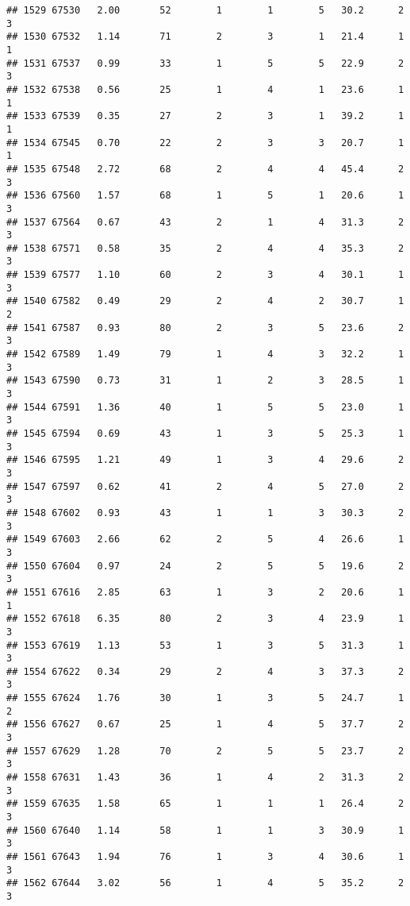 \documentclass[
]{article}
\begin{document}
\begin{verbatim}
## 1529 67530   2.00       52        1        1        5   30.2      2      3
## 1530 67532   1.14       71        2        3        1   21.4      1      1
## 1531 67537   0.99       33        1        5        5   22.9      2      3
## 1532 67538   0.56       25        1        4        1   23.6      1      1
## 1533 67539   0.35       27        2        3        1   39.2      1      1
## 1534 67545   0.70       22        2        3        3   20.7      1      1
## 1535 67548   2.72       68        2        4        4   45.4      2      3
## 1536 67560   1.57       68        1        5        1   20.6      1      3
## 1537 67564   0.67       43        2        1        4   31.3      2      3
## 1538 67571   0.58       35        2        4        4   35.3      2      3
## 1539 67577   1.10       60        2        3        4   30.1      1      3
## 1540 67582   0.49       29        2        4        2   30.7      1      2
## 1541 67587   0.93       80        2        3        5   23.6      2      3
## 1542 67589   1.49       79        1        4        3   32.2      1      3
## 1543 67590   0.73       31        1        2        3   28.5      1      3
## 1544 67591   1.36       40        1        5        5   23.0      1      3
## 1545 67594   0.69       43        1        3        5   25.3      1      3
## 1546 67595   1.21       49        1        3        4   29.6      2      3
## 1547 67597   0.62       41        2        4        5   27.0      2      3
## 1548 67602   0.93       43        1        1        3   30.3      2      3
## 1549 67603   2.66       62        2        5        4   26.6      1      3
## 1550 67604   0.97       24        2        5        5   19.6      2      3
## 1551 67616   2.85       63        1        3        2   20.6      1      1
## 1552 67618   6.35       80        2        3        4   23.9      1      3
## 1553 67619   1.13       53        1        3        5   31.3      1      3
## 1554 67622   0.34       29        2        4        3   37.3      2      3
## 1555 67624   1.76       30        1        3        5   24.7      1      2
## 1556 67627   0.67       25        1        4        5   37.7      2      3
## 1557 67629   1.28       70        2        5        5   23.7      2      3
## 1558 67631   1.43       36        1        4        2   31.3      2      3
## 1559 67635   1.58       65        1        1        1   26.4      2      3
## 1560 67640   1.14       58        1        1        3   30.9      1      3
## 1561 67643   1.94       76        1        3        4   30.6      1      3
## 1562 67644   3.02       56        1        4        5   35.2      2      3

\end{verbatim}
\end{document}
